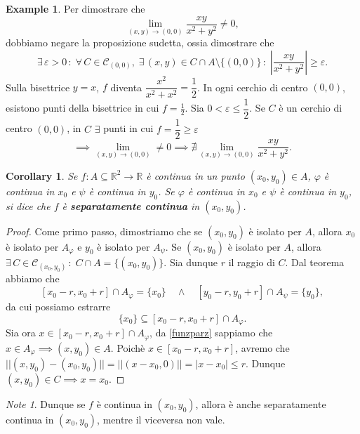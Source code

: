 \documentclass{article}
\theoremstyle{plain}
\newtheorem{cor}{Corollary}
\theoremstyle{definition}
\newtheorem{exmp}{Example}[section]
\theoremstyle{remark}
\newtheorem{note}{Note}
\begin{document}
\begin{exmp}
    Per dimostrare che 
    \[\lim_{(x,y)\to(0,0)}\dfrac{xy}{x^2+y^2}\neq0,\]
    dobbiamo negare la proposizione sudetta, ossia dimostrare che
    \[\exists\,\varepsilon>0\,:\;\forall\, C\in\mathcal{C}_{(0,0)},\; \exists\,(x,y)\in C\cap A\setminus\{(0,0)\}\,:\;\left|\dfrac{xy}{x^2+y^2}\right|\geq\varepsilon.\]
    Sulla bisettrice $y=x$, $f$ diventa $\dfrac{x^2}{x^2+x^2}=\dfrac{1}{2}$. In ogni cerchio di centro $(0,0)$, esistono punti della bisettrice in cui $f=\frac{1}{2}$.
    Sia $0<\varepsilon\leq\dfrac{1}{2}$. Se $C$ è un cerchio di centro $(0,0)$, in $C$ $\exists$ punti in cui $f=\dfrac{1}{2}\geq\varepsilon$
    \[\implies\lim_{(x,y)\to(0,0)}\neq0\implies\nexists\lim_{(x,y)\to(0,0)}\dfrac{xy}{x^2+y^2}.\]
\end{exmp}

\vspace{10pt}

\begin{bxthm}
\begin{cor}
Se $f:A\subseteq\mathbb{R}^2\to\mathbb{R}$ è continua in un punto $(x_0,y_0)\in A$, $\varphi$ è continua in $x_0$ e $\psi$ è continua in $y_0$.
Se $\varphi$ è continua in $x_0$ e $\psi$ è continua in $y_0$, si dice che $f$ è \textbf{separatamente continua} in $(x_0,y_0)$.
\end{cor}
\end{bxthm}
\begin{proof}
    Come primo passo, dimostriamo che se $(x_0,y_0)$ è isolato per $A$, allora $x_0$ è isolato per $A_\varphi$ e $y_0$ è isolato per $A_\psi$.
    Se $(x_0,y_0)$ è isolato per $A$, allora $\exists\,C\in\mathcal{C}_{(x_0,y_0)}\,:\;C\cap A=\{(x_0,y_0)\}$.
    Sia dunque $r$ il raggio di $C$.
    Dal teorema abbiamo che 
    \[[x_0-r,x_0+r]\cap A_\varphi=\{x_0\}\quad\land\quad[y_0-r,y_0+r]\cap A_\psi=\{y_0\},\]
    da cui possiamo estrarre
    \[\{x_0\}\subseteq[x_0-r,x_0+r]\cap A_\varphi.\]
    Sia ora $x\in[x_0-r,x_0+r]\cap A_\varphi$, da \ref{funzparz} sappiamo che $x\in A_\varphi\implies(x,y_0)\in A$.
    Poichè $x\in[x_0-r,x_0+r]$, avremo che $|| (x,y_0)-(x_0,y_0) ||=||(x-x_0,0)||=|x-x_0|\leq r$.
    Dunque $(x,y_0)\in C\implies x=x_0$.
\end{proof}

\vspace{10pt}

\begin{note}
    Dunque se $f$ è continua in $(x_0,y_0)$, allora è anche separatamente continua in $(x_0,y_0)$, mentre il viceversa non vale.
\end{note}
\end{document}
